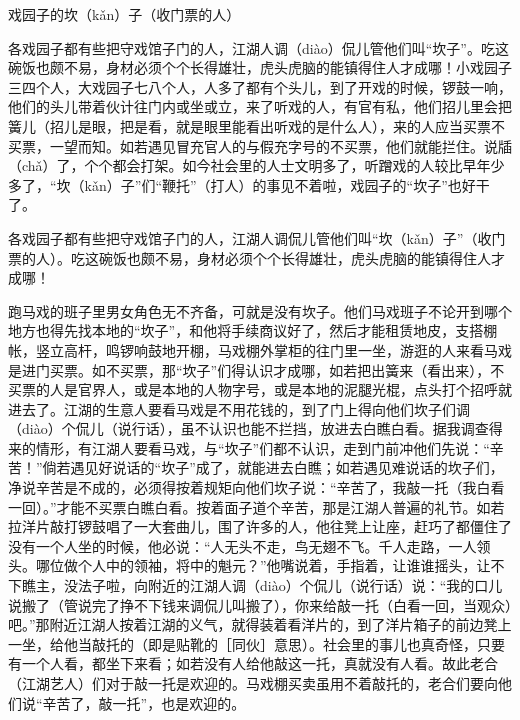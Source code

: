 \documentclass[12pt,UTF8]{ctexbook}
\begin{document}
戏园子的坎（kǎn）子（收门票的人）


各戏园子都有些把守戏馆子门的人，江湖人调（diào）侃儿管他们叫“坎子”。吃这碗饭也颇不易，身材必须个个长得雄壮，虎头虎脑的能镇得住人才成哪！小戏园子三四个人，大戏园子七八个人，人多了都有个头儿，到了开戏的时候，锣鼓一响，他们的头儿带着伙计往门内或坐或立，来了听戏的人，有官有私，他们招儿里会把簧儿（招儿是眼，把是看，就是眼里能看出听戏的是什么人），来的人应当买票不买票，一望而知。如若遇见冒充官人的与假充字号的不买票，他们就能拦住。说牐（chǎ）了，个个都会打架。如今社会里的人士文明多了，听蹭戏的人较比早年少多了，“坎（kǎn）子”们“鞭托”（打人）的事见不着啦，戏园子的“坎子”也好干了。

各戏园子都有些把守戏馆子门的人，江湖人调侃儿管他们叫“坎（kǎn）子”（收门票的人）。吃这碗饭也颇不易，身材必须个个长得雄壮，虎头虎脑的能镇得住人才成哪！



跑马戏的班子里男女角色无不齐备，可就是没有坎子。他们马戏班子不论开到哪个地方也得先找本地的“坎子”，和他将手续商议好了，然后才能租赁地皮，支搭棚帐，竖立高杆，鸣锣响鼓地开棚，马戏棚外掌柜的往门里一坐，游逛的人来看马戏是进门买票。如不买票，那“坎子”们得认识才成哪，如若把出簧来（看出来），不买票的人是官界人，或是本地的人物字号，或是本地的泥腿光棍，点头打个招呼就进去了。江湖的生意人要看马戏是不用花钱的，到了门上得向他们坎子们调（diào）个侃儿（说行话），虽不认识也能不拦挡，放进去白瞧白看。据我调查得来的情形，有江湖人要看马戏，与“坎子”们都不认识，走到门前冲他们先说：“辛苦！”倘若遇见好说话的“坎子”成了，就能进去白瞧；如若遇见难说话的坎子们，净说辛苦是不成的，必须得按着规矩向他们坎子说：“辛苦了，我敲一托（我白看一回）。”才能不买票白瞧白看。按着面子道个辛苦，那是江湖人普遍的礼节。如若拉洋片敲打锣鼓唱了一大套曲儿，围了许多的人，他往凳上让座，赶巧了都僵住了没有一个人坐的时候，他必说：“人无头不走，鸟无翅不飞。千人走路，一人领头。哪位做个人中的领袖，将中的魁元？”他嘴说着，手指着，让谁谁摇头，让不下瞧主，没法子啦，向附近的江湖人调（diào）个侃儿（说行话）说：“我的口儿说搬了（管说完了挣不下钱来调侃儿叫搬了），你来给敲一托（白看一回，当观众）吧。”那附近江湖人按着江湖的义气，就得装着看洋片的，到了洋片箱子的前边凳上一坐，给他当敲托的（即是贴靴的［同伙］意思）。社会里的事儿也真奇怪，只要有一个人看，都坐下来看；如若没有人给他敲这一托，真就没有人看。故此老合（江湖艺人）们对于敲一托是欢迎的。马戏棚买卖虽用不着敲托的，老合们要向他们说“辛苦了，敲一托”，也是欢迎的。
\end{document}
